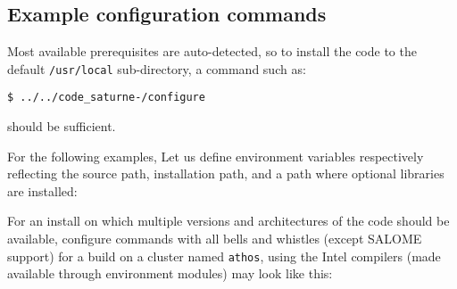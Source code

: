 \documentclass[a4paper,10pt,twoside]{csshortdoc}
\begin{document}
\subsection{Example configuration commands\label{sec:config:examples}}

Most available prerequisites are auto-detected, so to install the
code to the default \texttt{/usr/local} sub-directory,
a command such as:

\texttt{\$ ../../code\_saturne-\verscs/configure}

should be sufficient.

For the following examples, Let us define environment variables respectively
reflecting the \CS source path, installation path, and a path where optional
libraries are installed:


For an install on which multiple
versions and architectures of the code should be available,
configure commands with all bells and whistles (except SALOME support) for a
build on a cluster named \texttt{athos}, using the Intel compilers
(made available through environment modules) may look like this:
\end{document}
